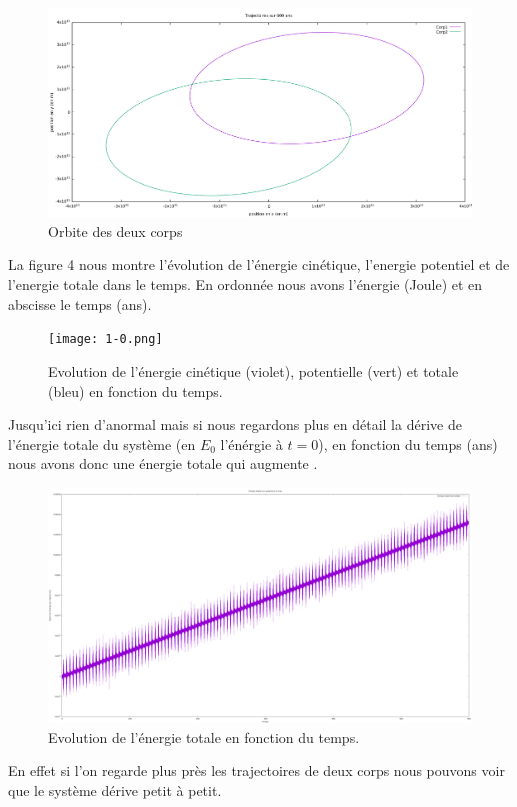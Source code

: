 \documentclass[a4paper]{article}
\begin{document}
\begin{figure}[h]
\centering
\includegraphics[width=.9\textwidth]{2.png}
\caption{Orbite des deux corps}
\end{figure}

La figure 4 nous montre l'évolution de l'énergie cinétique, l'energie potentiel et de l'energie totale dans le temps. En ordonnée nous avons l'énergie  (Joule) et en abscisse le temps (ans).

\begin{figure}[h]
\centering
\texttt{[image: 1-0.png]}
\caption{Evolution de l'énergie cinétique (violet), potentielle (vert) et totale (bleu) en fonction du temps.}
\end{figure}
\newpage

Jusqu'ici rien d'anormal mais si nous regardons plus en détail la dérive de l'énergie totale du système (en $E_0$ l'énérgie à $t = 0$), en fonction du temps (ans) nous avons donc une énergie totale qui augmente .

\begin{figure}[h]
\centering
\includegraphics[width=\textwidth]{Der.png}
\caption{Evolution de l'énergie totale en fonction du temps.}
\end{figure}

En effet si l'on regarde plus près les trajectoires de deux corps nous pouvons voir que le système dérive petit à petit.
\end{document}
